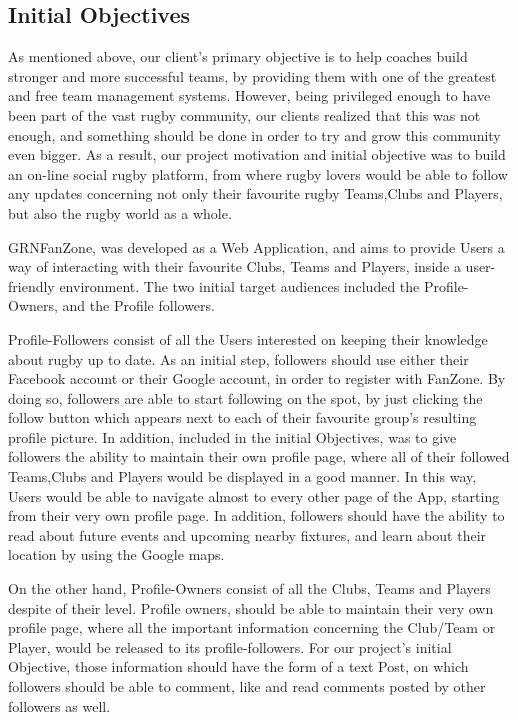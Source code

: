 \documentclass{l3proj}
\begin{document}
\subsection{Initial Objectives}
As mentioned above, our client's primary objective is to help coaches build
stronger and more successful teams, by providing them with one of the greatest
and free team management systems. However, being privileged enough to have been
part of the vast rugby community, our clients realized that this was not enough,
and something should be done in order to try and grow this community even bigger.
As a result, our project motivation and initial objective was to build an on-line
social rugby platform, from where rugby lovers would be able to follow any
updates concerning not only their favourite rugby Teams,Clubs and Players, but also
the rugby world as a whole.

GRNFanZone, was developed as a Web Application, and aims to provide Users a way of
interacting with their favourite Clubs, Teams and Players, inside a user-friendly
environment. The two initial target audiences included the Profile-Owners, and the
Profile followers.

Profile-Followers consist of all the Users interested on keeping their knowledge about
rugby up to date. As an initial step, followers should use either their Facebook account
or their Google account, in order to register with FanZone. By doing so, followers
are able to start following on the spot, by just clicking the follow button which
appears next to each of their favourite group's resulting profile picture. In addition,
included in the initial Objectives, was to give followers the ability to maintain their
own profile page, where all of their followed Teams,Clubs and Players would be displayed
in a good manner. In this way, Users would be able to navigate almost to every other
page of the App, starting from their very own profile page. In addition, followers
should have the ability to read about future events and upcoming nearby fixtures, and
learn about their location by using the Google maps.

On the other hand, Profile-Owners consist of all the Clubs, Teams and Players despite
of their level. Profile owners, should be able to maintain their very own profile page,
where all the important information concerning the Club/Team or Player, would be released
to its profile-followers. For our project's initial Objective, those information should
have the form of a text Post, on which followers should be able to comment, like and read
comments posted by other followers as well.
\end{document}
